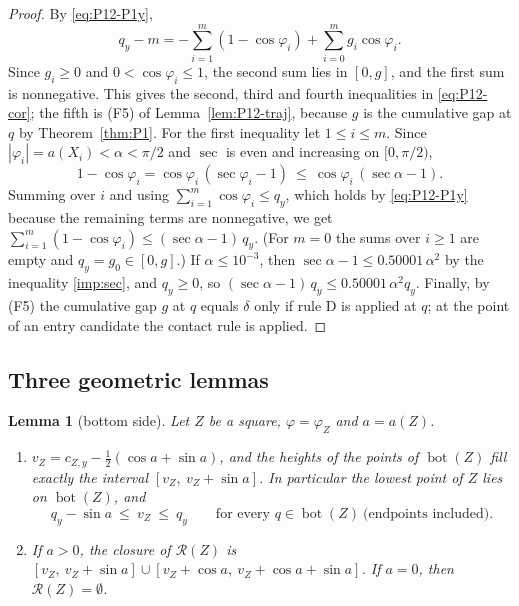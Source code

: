 \documentclass[11pt]{amsart}
\newcommand{\cR}{\mathcal R}
\newcommand{\Bot}{\operatorname{bot}}
\newtheorem{lemma}[theorem]{Lemma}
\theoremstyle{definition}
\theoremstyle{remark}
\numberwithin{equation}{section}
\begin{document}
\begin{proof}
By \eqref{eq:P12-P1y},
\[
q_y-m=-\sum_{i=1}^m(1-\cos\varphi_i)+\sum_{i=0}^mg_i\cos\varphi_i .
\]
Since $g_i\ge0$ and $0<\cos\varphi_i\le1$, the second sum lies in $[0,g]$, and the first sum is nonnegative. This gives the second, third and fourth inequalities in \eqref{eq:P12-cor}; the fifth is (F5) of Lemma~\ref{lem:P12-traj}, because $g$ is the cumulative gap at $q$ by Theorem~\ref{thm:P1}. For the first inequality let $1\le i\le m$. Since $|\varphi_i|=a(X_i)<\alpha<\pi/2$ and $\sec$ is even and increasing on $[0,\pi/2)$,
\[
1-\cos\varphi_i=\cos\varphi_i\,(\sec\varphi_i-1)\ \le\ \cos\varphi_i\,(\sec\alpha-1).
\]
Summing over $i$ and using $\sum_{i=1}^m\cos\varphi_i\le q_y$, which holds by \eqref{eq:P12-P1y} because the remaining terms are nonnegative, we get $\sum_{i=1}^m(1-\cos\varphi_i)\le(\sec\alpha-1)\,q_y$. (For $m=0$ the sums over $i\ge1$ are empty and $q_y=g_0\in[0,g]$.) If $\alpha\le10^{-3}$, then $\sec\alpha-1\le0.50001\,\alpha^2$ by the inequality \eqref{imp:sec}, and $q_y\ge0$, so $(\sec\alpha-1)\,q_y\le0.50001\,\alpha^2q_y$. Finally, by (F5) the cumulative gap $g$ at $q$ equals $\delta$ only if rule D is applied at $q$; at the point of an entry candidate the contact rule is applied.
\end{proof}

\subsection{Three geometric lemmas}\label{ssec:P12-geom}

\begin{lemma}[bottom side]\label{lem:P12-bot}
Let $Z$ be a square, $\varphi=\varphi_Z$ and $a=a(Z)$.
\begin{enumerate}[label=\textup{(\alph*)}]
\item $v_Z=c_{Z,y}-\frac12(\cos a+\sin a)$, and the heights of the points of $\Bot(Z)$ fill exactly the interval $[v_Z,\ v_Z+\sin a]$. In particular the lowest point of $Z$ lies on $\Bot(Z)$, and
\[
q_y-\sin a\ \le\ v_Z\ \le\ q_y\qquad\text{for every } q\in\Bot(Z)\ \text{(endpoints included)}.
\]
\item If $a>0$, the closure of $\cR(Z)$ is $[v_Z,\ v_Z+\sin a]\cup[v_Z+\cos a,\ v_Z+\cos a+\sin a]$. If $a=0$, then $\cR(Z)=\emptyset$.
\end{enumerate}
\end{lemma}
\end{document}
